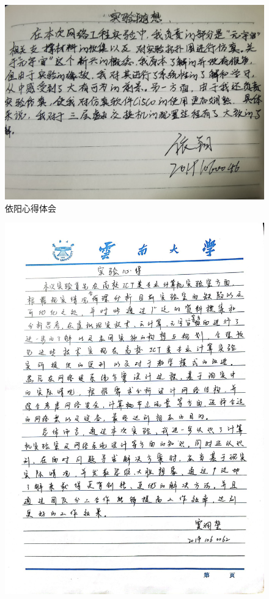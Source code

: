 \documentclass{imutthesis}
\begin{document}
\begin{figure}[h]
    \centering
        \centering
        \includegraphics[width=15cm]{yy.jpg}
        \caption{依阳心得体会}
\end{figure}

\newpage
\begin{figure}[h]
    \centering
        \centering
        \includegraphics[width=15cm]{hi.jpg}
        \caption{}
\end{figure}
\end{document}
